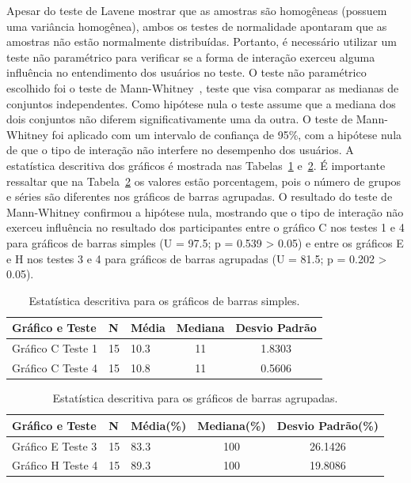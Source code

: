 \documentclass[
	12pt,				%
	openright,			%
	oneside,			%
	a4paper,			%
	english,			%
	brazil				%
	]{abntex2}
\begin{document}
Apesar do teste de Lavene mostrar que as amostras são homogêneas (possuem uma variância homogênea), ambos os testes de normalidade apontaram que as amostras não estão normalmente distribuídas. Portanto, é necessário utilizar um teste não paramétrico para verificar se a forma de interação exerceu alguma influência no entendimento dos usuários no teste. O teste não paramétrico escolhido foi o teste de Mann-Whitney~\cite{lazar2017research}, teste que visa comparar as medianas de conjuntos independentes. Como hipótese nula o teste assume que a mediana dos dois conjuntos não diferem significativamente uma da outra. O teste de Mann-Whitney foi aplicado com um intervalo de confiança de 95\%, com a hipótese nula de que o tipo de interação não interfere no desempenho dos usuários.
A estatística descritiva dos gráficos é mostrada nas Tabelas~\ref{tab:stats3e8} e~\ref{tab:stats5e9}. É importante ressaltar que na Tabela~\ref{tab:stats5e9} os valores estão porcentagem, pois o número de grupos e séries são diferentes nos gráficos de barras agrupadas. O resultado do teste de Mann-Whitney confirmou a hipótese nula, mostrando que o tipo de interação não exerceu influência no resultado dos participantes entre o gráfico C nos testes 1 e 4 para gráficos de barras simples (U = 97.5; p = 0.539 > 0.05) e entre os gráficos E e H nos testes 3 e 4 para gráficos de barras agrupadas (U = 81.5; p = 0.202 > 0.05).

\begin{table}[!h]
\def\arraystretch{1.3}
\centering
\caption{Estatística descritiva para os gráficos de barras simples.}
\label{tab:stats3e8}
\begin{tabular}{|l|l|l|c|c|}
\hline
\textbf{Gráfico e Teste} & \textbf{N} & \textbf{Média} & \textbf{Mediana} & \textbf{Desvio Padrão} \\ \hline
Gráfico C Teste 1   & 15         & 10.3           & 11               & 1.8303                 \\ \hline
Gráfico C Teste 4   & 15         & 10.8           & 11               & 0.5606                \\ \hline
\end{tabular}
\end{table}

\begin{table}[!h]
\centering
\def\arraystretch{1.3}
\caption{Estatística descritiva para os gráficos de barras agrupadas.}
\label{tab:stats5e9}
\begin{tabular}{|l|l|l|c|c|}
\hline
\textbf{Gráfico e Teste} & \textbf{N} & \textbf{Média}(\%) & \textbf{Mediana}(\%) & \textbf{Desvio Padrão}(\%) \\ \hline
Gráfico E Teste 3   & 15         & 83.3           & 100               & 26.1426                 \\ \hline
Gráfico H Teste 4   & 15         & 89.3           & 100               & 19.8086                \\ \hline
\end{tabular}
\end{table}
\end{document}
